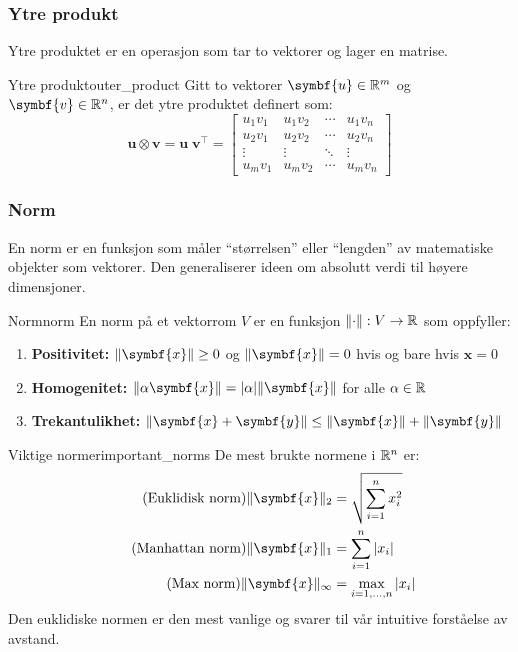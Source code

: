 \subsubsection{Ytre produkt}
Ytre produktet er en operasjon som tar to vektorer og lager en matrise.
\begin{definition}{Ytre produkt}{outer_product}
	Gitt to vektorer \( \symbf{u} \in \R^m \) og \( \symbf{v} \in \R^n \), er det ytre produktet definert som:
	\[
		\symbf{u} \otimes \symbf{v} = \symbf{u} \; \symbf{v}^\top =
		\begin{bmatrix}
			u_1v_1 & u_1v_2 & \cdots & u_1v_n \\
			u_2v_1 & u_2v_2 & \cdots & u_2v_n \\
			\vdots & \vdots & \ddots & \vdots \\
			u_mv_1 & u_mv_2 & \cdots & u_mv_n
		\end{bmatrix}
	\]
\end{definition}

\subsubsection{Norm}
En norm er en funksjon som måler \enquote{størrelsen} eller \enquote{lengden} av matematiske objekter som vektorer.
Den generaliserer ideen om absolutt verdi til høyere dimensjoner.

\begin{definition}{Norm}{norm}
	En norm på et vektorrom \(V\) er en funksjon \(\lVert\cdot\rVert: V \to \mathbb{R}\) som oppfyller:
	\begin{enumerate}
		\item \textbf{Positivitet:} \(\norm{\symbf{x}} \geq 0\) og \(\norm{\symbf{x}} = 0\) hvis og bare hvis \(\symbf{x} = 0\)
		\item \textbf{Homogenitet:} \(\norm{\alpha \symbf{x}} = |\alpha| \norm{\symbf{x}}\) for alle \(\alpha \in \mathbb{R}\)
		\item \textbf{Trekantulikhet:} \(\norm{\symbf{x} + \symbf{y}} \leq \norm{\symbf{x}} + \norm{\symbf{y}}\)
	\end{enumerate}
\end{definition}

\begin{remark}{Viktige normer}{important_norms}
	De mest brukte normene i \(\mathbb{R}^n\) er:
	\begin{align*}
		\tag{Euklidisk norm} \norm{\symbf{x}}_2 & = \sqrt{\sum_{i=1}^{n} x_i^2} \\
		\tag{Manhattan norm} \norm{\symbf{x}}_1 & = \sum_{i=1}^{n} |x_i|        \\
		\tag{Max norm} \norm{\symbf{x}}_\infty  & = \max_{i=1,\ldots,n} |x_i|
	\end{align*}
	Den euklidiske normen er den mest vanlige og svarer til vår intuitive forståelse av avstand.
\end{remark}

